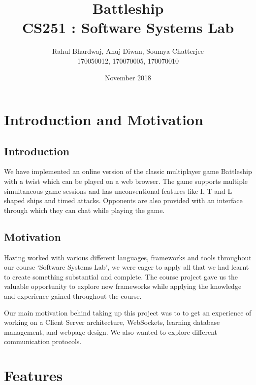 \documentclass[titlepage]{article}
\title{\textbf{Battleship} \\ CS251 : Software Systems Lab}
\author{Rahul Bhardwaj, Anuj Diwan, Soumya Chatterjee \\ 170050012, 170070005, 170070010}
\date{November 2018}
\begin{document}
\maketitle

\tableofcontents

\break

\section{Introduction and Motivation}
\subsection{Introduction}
We have implemented an online version of the classic multiplayer game Battleship with a twist which can be played on a web browser. The game supports multiple simultaneous game sessions and has unconventional features like I, T and L shaped ships and timed attacks. Opponents are also provided with an interface through which they can chat while playing the game.

\subsection{Motivation}
Having worked with various different languages, frameworks and tools throughout our course `Software Systems Lab', we were eager to apply all that we had learnt to create something substantial and complete. The course project gave us the valuable opportunity to explore new frameworks while applying the knowledge and experience gained throughout the course.

Our main motivation behind taking up this project was to to get an experience of working on a Client Server architecture, WebSockets, learning database management, and webpage design. We also wanted to explore different communication protocols.

\section{Features}
\end{document}
